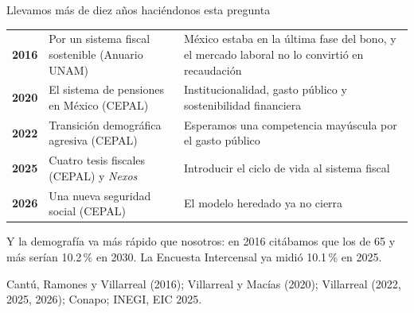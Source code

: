 \documentclass[aspectratio=169,11pt]{beamer}
\newcommand{\fuente}[1]{\par\vfill{\small\color{cGris}#1\par}}
\begin{document}
\begin{frame}{Llevamos más de diez años haciéndonos esta pregunta}
  \centering
  \setlength{\tabcolsep}{5pt}
  \begin{tabular}{@{}l>{\raggedright\arraybackslash}p{4.8cm}>{\raggedright\arraybackslash}p{6.6cm}@{}}
    \toprule
    \textbf{2016} & Por un sistema fiscal sostenible (Anuario UNAM) & México estaba en la última fase del bono, y el mercado laboral no lo convirtió en recaudación \\
    \textbf{2020} & El sistema de pensiones en México (CEPAL) & Institucionalidad, gasto público y sostenibilidad financiera \\
    \textbf{2022} & Transición demográfica agresiva (CEPAL) & Esperamos una competencia mayúscula por el gasto público \\
    \textbf{2025} & Cuatro tesis fiscales (CEPAL) y \emph{Nexos} & Introducir el ciclo de vida al sistema fiscal \\
    \textbf{2026} & Una nueva seguridad social (CEPAL) & El modelo heredado ya no cierra \\
    \bottomrule
  \end{tabular}
  \par\medskip\raggedright
  \pause
  Y la demografía va más rápido que nosotros: en 2016 citábamos que los de 65 y más serían 10.2\,\% en 2030. La Encuesta Intercensal ya midió 10.1\,\% en 2025.
  \fuente{Cantú, Ramones y Villarreal (2016); Villarreal y Macías (2020); Villarreal (2022, 2025, 2026); Conapo; INEGI, EIC 2025.}
\end{frame}
\end{document}
